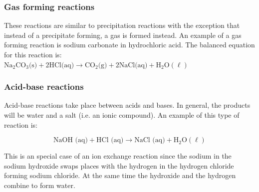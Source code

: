 {{\subsubsection*{Gas forming reactions}
These reactions are similar to precipitation reactions with the exception that instead of a precipitate forming, a gas is formed instead. An example of a gas forming reaction is sodium carbonate in hydrochloric acid. The balanced equation for this reaction is: \\
$\text{Na}_{2}\text{CO}_{3} \text{(s)} + 2\text{HCl} \text{(aq)} \to \text{CO}_{2} \text{(g)} + 2\text{NaCl} \text{(aq)} + \text{H}_{2}\text{O} (\ell)$ 
            \subsubsection*{Acid-base reactions}
            \nopagebreak
\label{m38719*id0821354}Acid-base reactions take place between acids and bases. In general, the products will be water and a salt (i.e. an ionic compound). An example of this type of reaction is: \label{m38719*eid1534}\nopagebreak\noindent{}
	    
    \begin{equation*}
    \text{NaOH (aq)}+\text{HCl (aq)}\to \text{NaCl (aq)}+{\text{H}}_{2}\text{O} (\ell)
      \end{equation*}
\par \label{m38719*eip-588}This is an special case of an ion exchange reaction since the sodium in the sodium hydroxide swaps places with the hydrogen in the hydrogen chloride forming sodium chloride. At the same time the hydroxide and the hydrogen combine to form water. \par 
\label{m38719*eip-454}
}}
